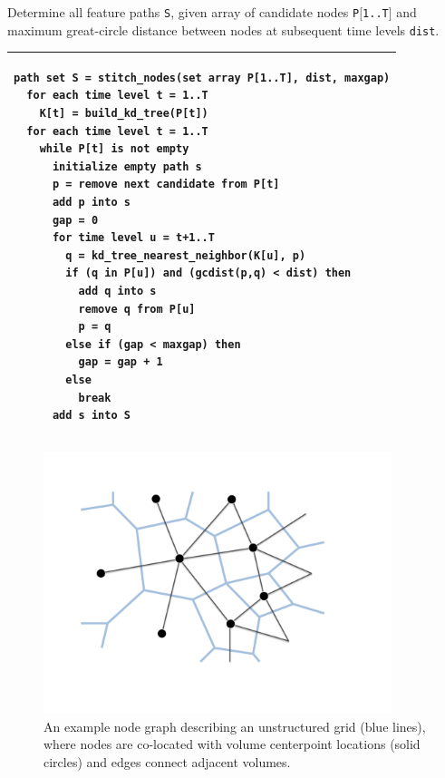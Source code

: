 \documentclass[gmdd, hvmath, online]{copernicus_discussions}
\begin{document}
\begin{algorithm}
\caption{Determine all feature paths \texttt{S}, given array of candidate nodes \texttt{P$[$1..T$]$} and maximum great-circle distance between nodes at subsequent time levels \texttt{dist}.\ \\} \label{alg:stitch_nodes}
\noindent \begin{tabular}{p{5in}}
\hline \small \begin{verbatim}
path set S = stitch_nodes(set array P[1..T], dist, maxgap)
  for each time level t = 1..T
    K[t] = build_kd_tree(P[t])
  for each time level t = 1..T
    while P[t] is not empty
      initialize empty path s
      p = remove next candidate from P[t]
      add p into s
      gap = 0
      for time level u = t+1..T
        q = kd_tree_nearest_neighbor(K[u], p)
        if (q in P[u]) and (gcdist(p,q) < dist) then
          add q into s
          remove q from P[u]
          p = q
        else if (gap < maxgap) then
          gap = gap + 1
        else
          break
      add s into S
\end{verbatim} \\
\hline
\end{tabular}
\end{algorithm}


\begin{figure}[H]
\begin{center}
\includegraphics[width=4in]{UnstructuredGrid.pdf}
\end{center}
\caption{An example node graph describing an unstructured grid (blue lines), where nodes are co-located with volume centerpoint locations (solid circles) and edges connect adjacent volumes.} \label{fig:unstructured_grid}
\end{figure}
\end{document}
